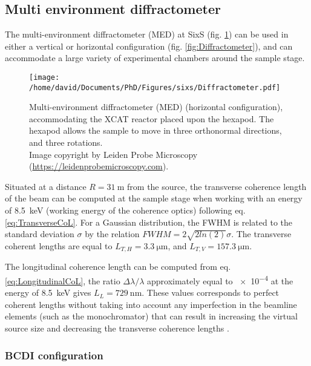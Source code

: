 \subsection{Multi environment diffractometer}\label{sec:MED}

The multi-environment diffractometer (MED) at SixS (fig. \ref{fig:MEDDiffractometer}) can be used in either a vertical or horizontal configuration (fig. \ref{fig:Diffractometer}), and can accommodate a large variety of experimental chambers around the sample stage.

\begin{figure}[!htb]
    \centering
    \texttt{[image: /home/david/Documents/PhD/Figures/sixs/Diffractometer.pdf]}
    \caption{
        Multi-environment diffractometer (MED) (horizontal configuration), accommodating the XCAT reactor \parencite{VanRijn2010} placed upon the hexapod.
        The hexapod allows the sample to move in three orthonormal directions, and three rotations.\\
        Image copyright by Leiden Probe Microscopy (\url{https://leidenprobemicroscopy.com}).
    }
    \label{fig:MEDDiffractometer}
\end{figure}

Situated at a distance $R = \qty{31}{\m}$ from the source, the transverse coherence length of the beam can be computed at the sample stage when working with an energy of \qty{8.5}{\keV} (working energy of the coherence optics) following eq. \ref{eq:TransverseCoL}.
For a Gaussian distribution, the FWHM is related to the standard deviation $\sigma$ by the relation $FWHM = 2\sqrt{2 ln (2) } \sigma$.
The transverse coherent lengths are equal to $L_{T,H} = \qty{3.3}{\um}$, and $L_{T,V} = \qty{157.3}{\um}$.

The longitudinal coherence length can be computed from eq. \ref{eq:LongitudinalCoL}, the ratio $\Delta\lambda/\lambda$ approximately equal to \num{e-4} at the energy of \qty{8.5}{\keV} gives $L_L = \qty{729}{\nm}$.
These values corresponds to perfect coherent lengths without taking into account any imperfection in the beamline elements (such as the monochromator) that can result in increasing the virtual source size and decreasing the transverse coherence lengths \parencite{Jacques2010}.

\subsubsection{BCDI configuration}

